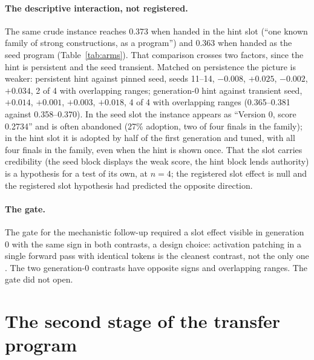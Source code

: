 \documentclass[11pt]{article}
\begin{document}
\begin{table}[!htbp]
\centering\footnotesize
\setlength{\tabcolsep}{2.5pt}

\caption{Final best per arm (median and range over four seeds) and the
share of valid proposals in the family, over the run and in generation 0.}
\label{tab:arms}
\end{table}

\paragraph{The descriptive interaction, not registered.} The same crude
instance reaches 0.373 when handed in the hint slot (``one known family of
strong constructions, as a program'') and 0.363 when handed as the seed
program (Table~\ref{tab:arms}). That comparison crosses two factors, since
the hint is persistent and the seed transient. Matched on persistence the
picture is weaker: persistent hint against pinned seed, seeds 11--14,
$-0.008$, $+0.025$, $-0.002$, $+0.034$, 2 of 4 with overlapping ranges;
generation-0 hint against transient seed, $+0.014$, $+0.001$, $+0.003$,
$+0.018$, 4 of 4 with overlapping ranges (0.365--0.381 against
0.358--0.370). In the seed slot the instance appears as ``Version 0, score
0.2734'' and is often abandoned (27\% adoption, two of four finals in the
family); in the hint slot it is adopted by half of the first generation
and tuned, with all four finals in the family, even when the hint is shown
once. That the slot carries credibility (the seed block displays the
weak score, the hint block lends authority) is a hypothesis for a test
of its own, at $n=4$; the registered slot effect is null and the registered
slot hypothesis had predicted the opposite direction.

\paragraph{The gate.} The gate for the mechanistic follow-up required a
slot effect visible in generation 0 with the same sign in both contrasts,
a design choice: activation patching in a single forward pass with
identical tokens is the cleanest contrast, not the only one
\citep{zhang2024patching}. The two generation-0 contrasts have opposite
signs and overlapping ranges. The gate did not open.

\section{The second stage of the transfer program}
\label{app:stage2}
\end{document}
